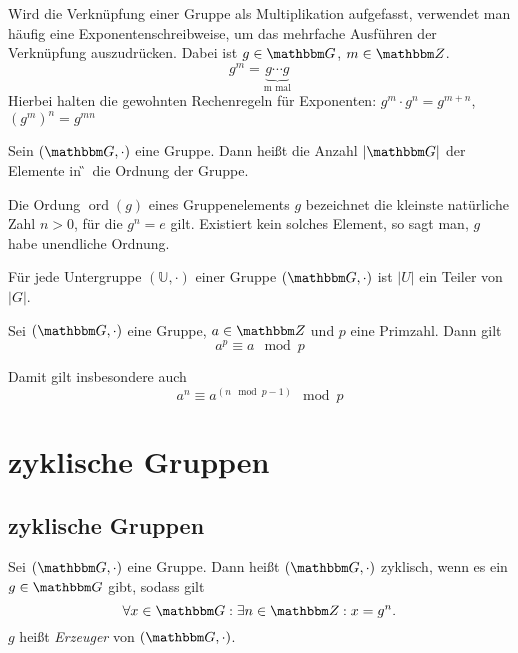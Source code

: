 \begin{definition}
Wird die Verknüpfung einer Gruppe als Multiplikation aufgefasst,
verwendet man häufig eine Exponentenschreibweise, um das mehrfache
Ausführen der Verknüpfung auszudrücken. Dabei ist $g\in \G$, $m \in \Z{}$.
\[ g^m = \underbrace{g\cdots g}_{\text{m mal}} \]
Hierbei halten die gewohnten Rechenregeln für Exponenten: $g^m\cdot g^n =
g^{m+n}$, $(g^m)^n = g^{mn}$
\end{definition}


\begin{definition}
  Sein $(\G, \cdot)$ eine Gruppe. Dann heißt die Anzahl $|\G|$ der Elemente in
  \G~die Ordnung der Gruppe.
\end{definition}

\begin{definition}
  Die Ordung $\operatorname{ord}(g) $ eines Gruppenelements $g$
  bezeichnet die kleinste 
  natürliche Zahl $n>0$, für die $g^n = e$ gilt. Existiert kein solches
  Element, so sagt man, $g$ habe unendliche Ordnung.
 \end{definition}

 \begin{theorem}
   Für jede Untergruppe $(\mathbb{U}, \cdot)$ einer Gruppe $(\G, \cdot)$
   ist $|U|$ ein Teiler von $|G|$.   
 \end{theorem}

 \begin{theorem}
   Sei $(\G, \cdot)$ eine Gruppe, $a \in \Z{}$ und $p$ eine
   Primzahl. Dann gilt
   \[a^p \equiv a \mod p\]
 \end{theorem}
Damit gilt insbesondere auch
\[a^n \equiv a^{(n \mod p-1)} \mod p\]
\section{zyklische Gruppen}

\subsection{zyklische Gruppen}
\begin{definition}
  Sei $(\G, \cdot)$ eine Gruppe. Dann heißt $(\G, \cdot)$ zyklisch, wenn
  es ein $g \in \G$ gibt, sodass gilt
\[
  \forall x \in \G: \exists n \in \Z{}: x=g^n.
\]
$g$ heißt \textit{Erzeuger} von $(\G, \cdot)$.
\end{definition}

